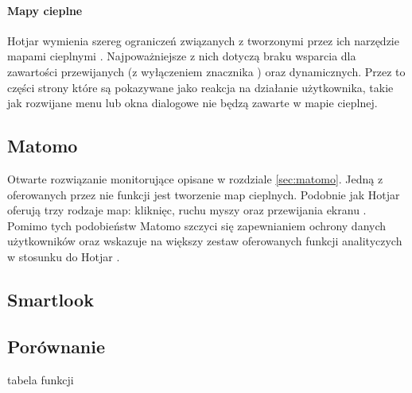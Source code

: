 \paragraph{Mapy cieplne}
Hotjar wymienia szereg ograniczeń związanych z tworzonymi przez ich narzędzie mapami cieplnymi \cite{Hotjar_limitations}. Najpoważniejsze z nich dotyczą braku wsparcia dla zawartości przewijanych (z wyłączeniem znacznika ) oraz  dynamicznych. Przez to części strony które są pokazywane jako reakcja na działanie użytkownika, takie jak rozwijane menu lub okna dialogowe nie będzą zawarte w mapie cieplnej.

\subsection{Matomo}
Otwarte rozwiązanie monitorujące opisane w rozdziale \ref{sec:matomo}. Jedną z oferowanych przez nie funkcji jest tworzenie map cieplnych. Podobnie jak Hotjar oferują trzy rodzaje map: kliknięc, ruchu myszy oraz przewijania ekranu \cite{Matomo_heatmaps}. Pomimo tych podobieństw Matomo szczyci się zapewnianiem ochrony danych użytkowników oraz wskazuje na większy zestaw oferowanych funkcji analityczych w stosunku do Hotjar \cite{Matomo_hotjar}.

\subsection{Smartlook}

\subsection{Porównanie}
tabela funkcji
